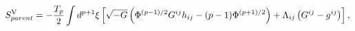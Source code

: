 \begin{equation}
S^{{\rm V}}_{parent}=-\frac{T_p}{2}\int d^{p+1}{\xi}\left[\sqrt{-G}
\left({\Phi}^{(p-1)/2}G^{ij}h_{ij}-(p-1){\Phi}^{(p+1)/2}\right)
+{\Lambda}_{ij}\left(G^{ij}-g^{ij}\right)\right],
\end{equation}

